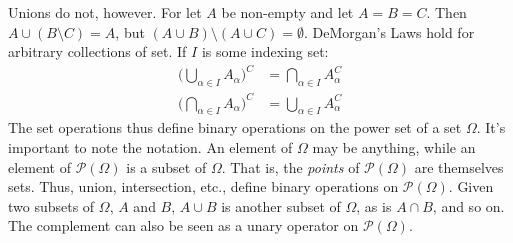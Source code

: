         Unions do not, however. For let $A$ be non-empty
        and let $A=B=C$. Then $A\cup(B\setminus{C})=A$, but
        $(A\cup{B})\setminus(A\cup{C})=\emptyset$.
        DeMorgan's Laws hold for arbitrary collections
        of set. If $I$ is some indexing set:
        \begin{align}
            \Big(\bigcup_{\alpha\in{I}}A_{\alpha}\Big)^{C}
            &=\bigcap_{\alpha\in{I}}A_{\alpha}^{C}\\
            \Big(\bigcap_{\alpha\in{I}}A_{\alpha}\Big)^{C}
            &=\bigcup_{\alpha\in{I}}A_{\alpha}^{C}
        \end{align}
        The set operations thus define binary operations
        on the power set of a set $\Omega$. It's important
        to note the notation. An element of $\Omega$ may
        be anything, while an element of
        $\mathcal{P}(\Omega)$ is a subset of $\Omega$.
        That is, the \textit{points} of $\mathcal{P}(\Omega)$
        are themselves sets. Thus, union, intersection,
        etc., define binary operations on
        $\mathcal{P}(\Omega)$. Given two subsets of
        $\Omega$, $A$ and $B$, $A\cup{B}$ is another
        subset of $\Omega$, as is $A\cap{B}$, and so on.
        The complement can also be seen as a unary operator
        on $\mathcal{P}(\Omega)$.

